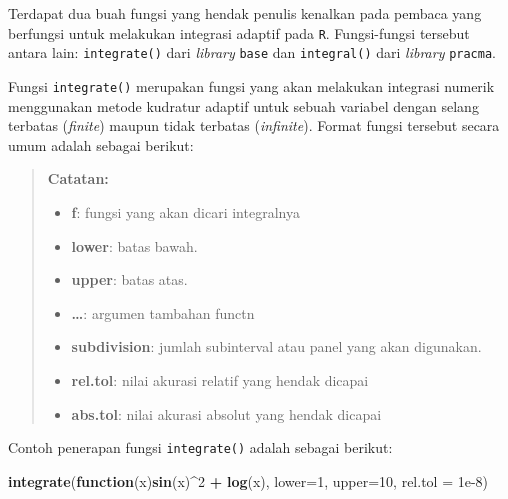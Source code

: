 \documentclass[]{book}
\newenvironment{Shaded}{\begin{snugshade}}{\end{snugshade}}
\newcommand{\ControlFlowTok}[1]{\textcolor[rgb]{0.13,0.29,0.53}{\textbf{#1}}}
\newcommand{\DataTypeTok}[1]{\textcolor[rgb]{0.13,0.29,0.53}{#1}}
\newcommand{\DecValTok}[1]{\textcolor[rgb]{0.00,0.00,0.81}{#1}}
\newcommand{\FloatTok}[1]{\textcolor[rgb]{0.00,0.00,0.81}{#1}}
\newcommand{\KeywordTok}[1]{\textcolor[rgb]{0.13,0.29,0.53}{\textbf{#1}}}
\newcommand{\NormalTok}[1]{#1}
\newcommand{\OperatorTok}[1]{\textcolor[rgb]{0.81,0.36,0.00}{\textbf{#1}}}
\newcommand{\StringTok}[1]{\textcolor[rgb]{0.31,0.60,0.02}{#1}}
\providecommand{\tightlist}{%
  \setlength{\itemsep}{0pt}\setlength{\parskip}{0pt}}
\theoremstyle{definition}
\theoremstyle{definition}
\theoremstyle{definition}
\theoremstyle{remark}
\begin{document}
Terdapat dua buah fungsi yang hendak penulis kenalkan pada pembaca yang berfungsi untuk melakukan integrasi adaptif pada \texttt{R}. Fungsi-fungsi tersebut antara lain: \texttt{integrate()} dari \emph{library} \texttt{base} dan \texttt{integral()} dari \emph{library} \texttt{pracma}.

Fungsi \texttt{integrate()} merupakan fungsi yang akan melakukan integrasi numerik menggunakan metode kudratur adaptif untuk sebuah variabel dengan selang terbatas (\emph{finite}) maupun tidak terbatas (\emph{infinite}). Format fungsi tersebut secara umum adalah sebagai berikut:

\begin{Shaded}
\end{Shaded}

\begin{quote}
\textbf{Catatan:}

\begin{itemize}
\tightlist
\item
  \textbf{f}: fungsi yang akan dicari integralnya
\item
  \textbf{lower}: batas bawah.
\item
  \textbf{upper}: batas atas.
\item
  \textbf{\ldots{}}: argumen tambahan functn
\item
  \textbf{subdivision}: jumlah subinterval atau panel yang akan digunakan.
\item
  \textbf{rel.tol}: nilai akurasi relatif yang hendak dicapai
\item
  \textbf{abs.tol}: nilai akurasi absolut yang hendak dicapai
\end{itemize}
\end{quote}

Contoh penerapan fungsi \texttt{integrate()} adalah sebagai berikut:

\begin{Shaded}
\begin{Highlighting}[]
\KeywordTok{integrate}\NormalTok{(}\ControlFlowTok{function}\NormalTok{(x)}\KeywordTok{sin}\NormalTok{(x)}\OperatorTok{^}\DecValTok{2} \OperatorTok{+}\StringTok{ }\KeywordTok{log}\NormalTok{(x),}
          \DataTypeTok{lower=}\DecValTok{1}\NormalTok{, }\DataTypeTok{upper=}\DecValTok{10}\NormalTok{,}
          \DataTypeTok{rel.tol =} \FloatTok{1e-8}\NormalTok{)}
\end{Highlighting}
\end{Shaded}
\end{document}
